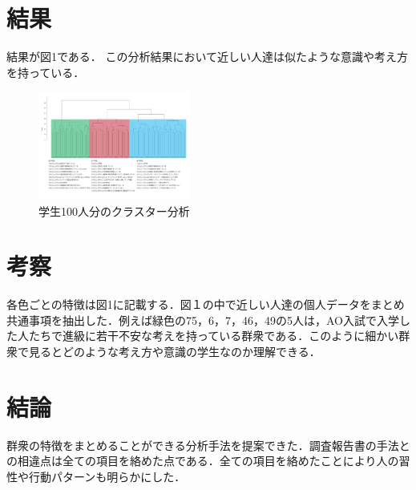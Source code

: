 \documentclass[uplatex,twocolumn,dvipdfmx]{jsarticle}
\begin{document}
\section{結果}
結果が図1である．
この分析結果において近しい人達は似たような意識や考え方を持っている．
\begin{figure}[h]
\centering
\includegraphics[width=5cm]{clusterresults.pdf}
\caption{学生100人分のクラスター分析}\label{学生100人分のクラスター分析}
\end{figure}


\section{考察}
各色ごとの特徴は図1に記載する．図１の中で近しい人達の個人データをまとめ共通事項を抽出した．例えば緑色の75，6，7，46，49の5人は，AO入試で入学した人たちで進級に若干不安な考えを持っている群衆である．このように細かい群衆で見るとどのような考え方や意識の学生なのか理解できる．
\section{結論}
群衆の特徴をまとめることができる分析手法を提案できた．調査報告書の手法との相違点は全ての項目を絡めた点である．全ての項目を絡めたことにより人の習性や行動パターンも明らかにした．

    


\end{document}
